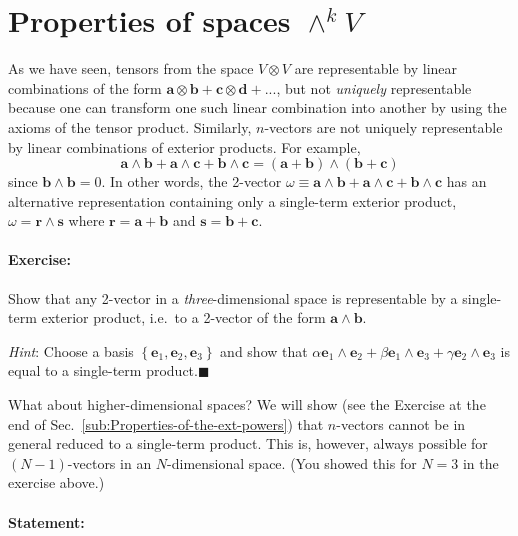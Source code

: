 \section{Properties of spaces $\wedge^{k}V$\label{sec:Properties-of-the-wedgekV}}

As we have seen, tensors from the space $V\otimes V$ are representable
by linear combinations of the form $\mathbf{a}\otimes\mathbf{b}+\mathbf{c}\otimes\mathbf{d}+...$,
but not \emph{uniquely} representable because one can transform one
such linear combination into another by using the axioms of the tensor
product. Similarly, $n$-vectors are not uniquely representable by
linear combinations of exterior products. For example,\[
\mathbf{a}\wedge\mathbf{b}+\mathbf{a}\wedge\mathbf{c}+\mathbf{b}\wedge\mathbf{c}=(\mathbf{a}+\mathbf{b})\wedge(\mathbf{b}+\mathbf{c})\]
 since $\mathbf{b}\wedge\mathbf{b}=0$. In other words, the 2-vector
$\omega\equiv\mathbf{a}\wedge\mathbf{b}+\mathbf{a}\wedge\mathbf{c}+\mathbf{b}\wedge\mathbf{c}$
has an alternative representation containing only a single-term exterior
product, $\omega=\mathbf{r}\wedge\mathbf{s}$ where $\mathbf{r}=\mathbf{a}+\mathbf{b}$
and $\mathbf{s}=\mathbf{b}+\mathbf{c}$.


\paragraph{Exercise:}

Show that any 2-vector in a \emph{three}-dimen\-sion\-al space is
representable by a single-term exterior product, i.e.~to a 2-vector
of the form $\mathbf{a}\wedge\mathbf{b}$.

\emph{Hint}: Choose a basis $\left\{ \mathbf{e}_{1},\mathbf{e}_{2},\mathbf{e}_{3}\right\} $
and show that $\alpha\mathbf{e}_{1}\wedge\mathbf{e}_{2}+\beta\mathbf{e}_{1}\wedge\mathbf{e}_{3}+\gamma\mathbf{e}_{2}\wedge\mathbf{e}_{3}$
is equal to a single-term product.\hfill{}$\blacksquare$

What about higher-dimen\-sion\-al spaces? We will show (see the
Exercise at the end of Sec.~\ref{sub:Properties-of-the-ext-powers})
that $n$-vectors cannot be in general reduced to a single-term product.
This is, however, always possible for $(N-1)$-vectors in an $N$-dimen\-sion\-al
space. (You showed this for $N=3$ in the exercise above.)


\paragraph{Statement:}

